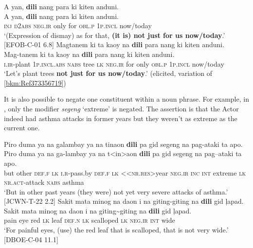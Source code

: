 \ea
\label{bkm:Ref373356719}
A  yan,  \textbf{dili}  nang  para  ki  kiten  anduni. \\\smallskip
\gll A  yan,  \textbf{dili}  nang  para  ki  kiten  anduni. \\
\textsc{inj}  \textsc{d}2\textsc{abs}  \textsc{neg.ir}  only  for  \textsc{obl.p}  1\textsc{p.incl}  now/today \\
\glt ‘(Expression of dismay) as for that, \textbf{(it is) not just for us now/today}.’ [EFOB-C-01 6.8]
\z
\ea
Magtanem  ki  ta  kaoy  na  \textbf{dili}  para  nang  ki  kiten  anduni. \\\smallskip
\gll Mag-tanem  ki  ta  kaoy  na  \textbf{dili}  para  nang  ki  kiten  anduni. \\
\textsc{i.ir}-plant  1\textsc{p.incl.abs}  \textsc{nabs}  tree  \textsc{lk}  \textsc{neg.ir}  for  only  \textsc{obl.p}  1\textsc{p.incl}  now/today \\
\glt ‘Let’s plant trees \textbf{not just for us now/today}.’ (elicited, variation of \ref{bkm:Ref373356719})
\z

It is also possible to negate one constituent within a noun phrase. For example, in , only the modifier \textit{segeng} ‘extreme’ is negated. The assertion is that the Actor indeed had asthma attacks in former years but they weren’t as extreme as the current one.

\ea
\label{bkm:Ref446156832}
Piro  duma  ya  na  galambay  ya  na  tinaon \textbf{dili}  pa  gid segeng  na  pag-ataki  ta  apo. \\\smallskip
\gll Piro  duma  ya  na  ga-lambay  ya  na  t<in>aon \textbf{dili}  pa  gid segeng  na  pag--ataki  ta  apo. \\
but  other  \textsc{def.f}  \textsc{lk}  \textsc{i.r}-pass.by  \textsc{def.f}  \textsc{lk}  <\textsc{<nr.res>}year
\textsc{neg.ir}  \textsc{inc}  \textsc{int}
extreme  \textsc{lk}  \textsc{nr.act}-attack  \textsc{nabs}  asthma \\
\glt `But in other past years (they were) not yet very severe attacks of asthma.’ [JCWN-T-22 2.2]
\z
\ea
Sakit  mata  minog  na  daon  i  na  giting-giting  na  \textbf{dili}  gid  ļapad. \\\smallskip
\gll Sakit  mata  minog  na  daon  i  na  giting\sim giting  na  \textbf{dili}  gid  ļapad. \\
pain  eye  red  \textsc{lk}  leaf  \textsc{def.n}  \textsc{lk}  scalloped  \textsc{lk}  \textsc{neg.ir}  \textsc{int}  wide \\
\glt ‘For painful eyes, (use) the red leaf that is scalloped, that is not very wide.’ [DBOE-C-04 11.1]
\z

